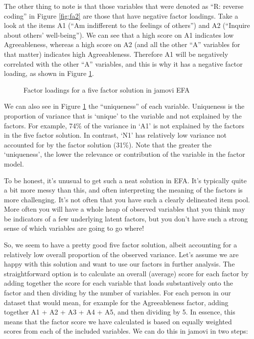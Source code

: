 The other thing to note is that those variables that were denoted as “R: reverse coding” in Figure \ref{fig:fa2} are those that have negative factor loadings. Take a look at the items A1 (“Am indifferent to the feelings of others”) and A2 (“Inquire about others' well-being”). We can see that a high score on A1 indicates low Agreeableness, whereas a high score on A2 (and all the other “A” variables for that matter) indicates high Agreeableness. Therefore A1 will be negatively correlated with the other “A” variables, and this is why it has a negative factor loading, as shown in Figure \ref{fig:fa7}. 

\begin{figure}[!htb]
\begin{center}
\caption{Factor loadings for a five factor solution in jamovi EFA}
\label{fig:fa7}
\HR
\end{center}
\end{figure}

We can also see in Figure \ref{fig:fa7} the “uniqueness” of each variable. Uniqueness is the proportion of variance that is ‘unique’ to the variable and not explained by the factors. For example, 74\% of the variance in ‘A1’ is not explained by the factors in the five factor solution. In contrast, ‘N1’ has relatively low variance not accounted for by the factor solution (31\%). Note that the greater the ‘uniqueness’, the lower the relevance or contribution of the variable in the factor model. 

To be honest, it’s unusual to get such a neat solution in EFA. It’s typically quite a bit more messy than this, and often interpreting the meaning of the factors is more challenging. It’s not often that you have such a clearly delineated item pool. More often you will have a whole heap of observed variables that you think may be indicators of a few underlying latent factors, but you don’t have such a strong sense of which variables are going to go where!

So, we seem to have a pretty good five factor solution, albeit accounting for a relatively low overall proportion of the observed variance. Let’s assume we are happy with this solution and want to use our factors in further analysis. The straightforward option is to calculate an overall (average) score for each factor by adding together the score for each variable that loads substantively onto the factor and then dividing by the number of variables. For each person in our dataset that would mean, for example for the Agreeableness factor, adding together A1 + A2 + A3 + A4 + A5, and then dividing by 5. In essence, this means that the factor score we have calculated is based on equally weighted scores from each of the included variables. We can do this in jamovi in two steps:

